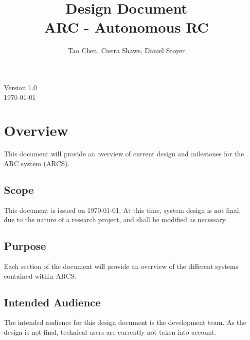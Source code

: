 \documentclass[compsoc,draftclsnofoot,onecolumn,10pt]{IEEEtran}
\date{}
\begin{document}
\begin{titlepage}
	\title{Design Document\\
	ARC - Autonomous RC}
	\author{Tao Chen, Cierra Shawe, Daniel Stoyer}
	\maketitle
	\begin{center}
	Version 1.0\\
	\vspace{1.9cm}
	\today
	\end{center}

	\thispagestyle{empty} %
	
\end{titlepage}

\tableofcontents

\newpage

\section{Overview}  
This document will provide an overview of current design and milestones for the ARC system (ARCS). 
\subsection{Scope} 
This document is issued on \today. At this time, system design is not final, due to the nature of a research project, and shall be modified as necessary. 
\subsection{Purpose}
Each section of the document will provide an overview of the different systems contained within ARCS.
\subsection{Intended Audience} 
The intended audience for this design document is the development team. As the design is not final, technical users are currently not taken into account. 
\end{document}
